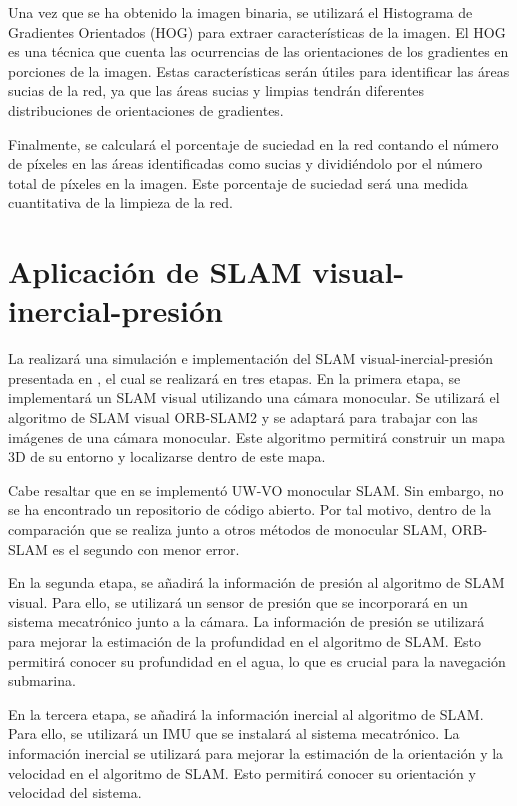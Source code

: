 Una vez que se ha obtenido la imagen binaria, se utilizará el Histograma de Gradientes Orientados (HOG) para extraer características de la imagen. El HOG es una técnica que cuenta las ocurrencias de las orientaciones de los gradientes en porciones de la imagen. Estas características serán útiles para identificar las áreas sucias de la red, ya que las áreas sucias y limpias tendrán diferentes distribuciones de orientaciones de gradientes.

Finalmente, se calculará el porcentaje de suciedad en la red contando el número de píxeles en las áreas identificadas como sucias y dividiéndolo por el número total de píxeles en la imagen. Este porcentaje de suciedad será una medida cuantitativa de la limpieza de la red.

\section{Aplicación de SLAM visual-inercial-presión} \label{VIP_SLAM}

La realizará una simulación e implementación del SLAM visual-inercial-presión presentada en \cite{cite:Ferrera}, el cual se realizará en tres etapas. En la primera etapa, se implementará un SLAM visual utilizando una cámara monocular. Se utilizará el algoritmo de SLAM visual ORB-SLAM2 \cite{murTRO2015} y se adaptará para trabajar con las imágenes de una cámara monocular. Este algoritmo permitirá construir un mapa 3D de su entorno y localizarse dentro de este mapa. 

Cabe resaltar que en \cite{cite:Ferrera} se implementó UW-VO monocular SLAM. Sin embargo, no se ha encontrado un repositorio de código abierto. Por tal motivo, dentro de la comparación que se realiza junto a otros métodos de monocular SLAM, ORB-SLAM es el segundo con menor error. 

En la segunda etapa, se añadirá la información de presión al algoritmo de SLAM visual. Para ello, se utilizará un sensor de presión que se incorporará en un sistema mecatrónico junto a la cámara. La información de presión se utilizará para mejorar la estimación de la profundidad en el algoritmo de SLAM. Esto permitirá conocer su profundidad en el agua, lo que es crucial para la navegación submarina.

En la tercera etapa, se añadirá la información inercial al algoritmo de SLAM. Para ello, se utilizará un IMU que se instalará al sistema mecatrónico. La información inercial se utilizará para mejorar la estimación de la orientación y la velocidad en el algoritmo de SLAM. Esto permitirá conocer su orientación y velocidad del sistema.
